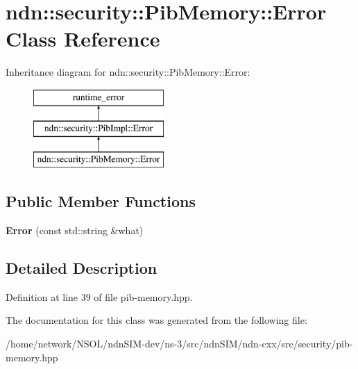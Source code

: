 \hypertarget{classndn_1_1security_1_1PibMemory_1_1Error}{}\section{ndn\+:\+:security\+:\+:Pib\+Memory\+:\+:Error Class Reference}
\label{classndn_1_1security_1_1PibMemory_1_1Error}
Inheritance diagram for ndn\+:\+:security\+:\+:Pib\+Memory\+:\+:Error\+:\begin{figure}[H]
\begin{center}
\leavevmode
\includegraphics[height=3.000000cm]{classndn_1_1security_1_1PibMemory_1_1Error}
\end{center}
\end{figure}
\subsection*{Public Member Functions}
\begin{DoxyCompactItemize}
\item 
{\bfseries Error} (const std\+::string \&what)\hypertarget{classndn_1_1security_1_1PibMemory_1_1Error_ae1a4281a51b53d61a2e2bc5339734a43}{}\label{classndn_1_1security_1_1PibMemory_1_1Error_ae1a4281a51b53d61a2e2bc5339734a43}

\end{DoxyCompactItemize}


\subsection{Detailed Description}


Definition at line 39 of file pib-\/memory.\+hpp.



The documentation for this class was generated from the following file\+:\begin{DoxyCompactItemize}
\item 
/home/network/\+N\+S\+O\+L/ndn\+S\+I\+M-\/dev/ns-\/3/src/ndn\+S\+I\+M/ndn-\/cxx/src/security/pib-\/memory.\+hpp\end{DoxyCompactItemize}
